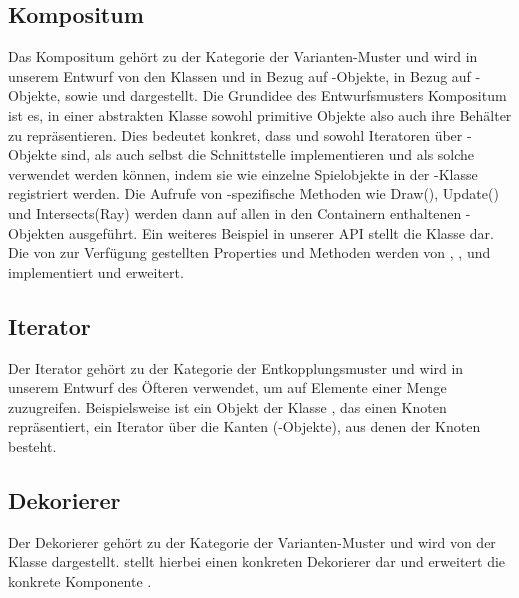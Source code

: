 \subsection{Kompositum}
Das Kompositum gehört zu der Kategorie der Varianten-Muster und wird in unserem Entwurf von den Klassen  und  in Bezug auf -Objekte,  in Bezug auf -Objekte, sowie  und  dargestellt.
\newline
\newline
Die Grundidee des Entwurfsmusters Kompositum ist es, in einer abstrakten Klasse sowohl primitive Objekte also auch ihre Behälter zu repräsentieren.
\newline
Dies bedeutet konkret, dass  und  sowohl Iteratoren über -Objekte sind, als auch selbst die Schnittstelle  implementieren und als solche verwendet werden können, indem sie wie einzelne Spielobjekte in der -Klasse registriert werden. Die Aufrufe von -spezifische Methoden wie Draw(), Update() und Intersects(Ray) werden dann auf allen in den Containern enthaltenen -Objekten ausgeführt.
\newline
\newline
Ein weiteres Beispiel in unserer API stellt die Klasse  dar. Die von  zur Verfügung gestellten Properties und Methoden werden von , ,  und  implementiert und erweitert.

\subsection{Iterator}
Der Iterator gehört zu der Kategorie der Entkopplungsmuster und wird in unserem Entwurf des Öfteren verwendet, um auf Elemente einer Menge zuzugreifen. Beispielsweise ist ein Objekt der Klasse , das einen Knoten repräsentiert, ein Iterator über die Kanten (-Objekte), aus denen der Knoten besteht.


\subsection{Dekorierer}
Der Dekorierer gehört zu der Kategorie der Varianten-Muster und wird von der Klasse  dargestellt. 
 stellt hierbei einen konkreten Dekorierer dar und erweitert die konkrete Komponente .

